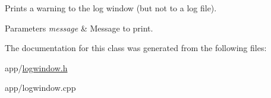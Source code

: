 Prints a warning to the log window (but not to a log file). 


\begin{DoxyParams}{Parameters}
{\em message} & Message to print. \\
\hline
\end{DoxyParams}


The documentation for this class was generated from the following files\-:\begin{DoxyCompactItemize}
\item 
app/\hyperlink{logwindow_8h}{logwindow.\-h}\item 
app/logwindow.\-cpp\end{DoxyCompactItemize}
